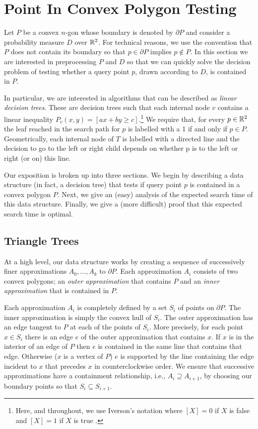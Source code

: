 \documentclass[charterfonts,lotsofwhite]{patmorin}
\newcommand{\boundary}{\partial}
\begin{document}
\section{Point In Convex Polygon Testing}

Let $P$ be a convex $n$-gon whose boundary is denoted by $\partial P$
and consider a probability measure $D$ over $\mathbb{R}^2$.  For technical
reasons, we use the convention that $P$ does not contain its boundary
so that $p\in \boundary P$ implies $p\not\in P$.  In this section we
are interested in preprocessing $P$ and $D$ so that we can quickly
solve the decision problem of testing whether a query point $p$, drawn
according to $D$, is contained in $P$. 

In particular, we are interested in algorithms that can be described
as \emph{linear decision trees}.  These are decision trees such that
each internal node $v$ contains a linear inequality $P_v(x,y)=[ax+by
\ge c]$.\footnote{Here, and throughout, we use Iverson's notation
where $[X]=0$ if $X$ is false and $[X]=1$ if $X$ is true \cite{k92}.}
We require that, for every $p\in\mathbb{R}^2$ the leaf reached in the search
path for $p$ is labelled with a 1 if and only if $p\in P$.
Geometrically, each internal node of $T$ is labelled with a directed
line and the decision to go to the left or right child depends on
whether p is to the left or right (or on) this line.  

Our exposition is broken up into three sections.  We begin by
describing a data structure (in fact, a decision tree) that tests if
query point $p$ is contained in a convex polygon  $P$.  Next, we give
an (easy) analysis of the expected search time of this data structure.
Finally, we give a (more difficult) proof that this expected search
time is optimal.


\subsection{Triangle Trees}

At a high level, our data structure works by creating a sequence of
successively finer approximations $A_0,\ldots,A_k$ to $\boundary P$.
Each approximation $A_i$ consists of two convex polygons; an
\emph{outer approximation} that contains $P$ and an \emph{inner
approximation} that is contained in $P$.

Each approximation $A_i$ is completely defined by a set $S_i$ of
points on $\boundary P$.  The inner approximation is simply the convex
hull of $S_i$.  The outer approximation has an edge tangent to $P$ at
each of the points of $S_i$.  More precisely, for each point $x\in
S_i$ there is an edge $e$ of the outer approximation that contains
$x$.  If $x$ is in the interior of an edge of $P$ then $e$ is
contained in the same line that contains that edge. Otherwise ($x$ is
a vertex of $P$) $e$ is supported by the line containing the edge
incident to $x$ that precedes $x$ in counterclockwise order.  We
ensure that successive approximations have a containment relationship,
i.e., $A_i\supseteq A_{i+1}$, by choosing our boundary points so that
$S_i\subseteq S_{i+1}$.
\end{document}
